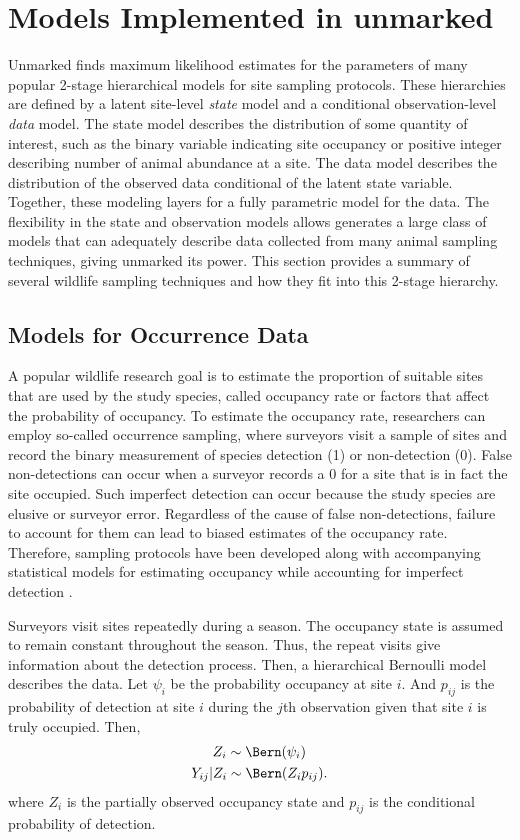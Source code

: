 \section{Models Implemented in unmarked}

Unmarked finds maximum likelihood estimates for the parameters of
many popular 2-stage hierarchical models for site sampling
protocols.  These hierarchies are defined by a latent site-level \emph{state}
model and a conditional observation-level \emph{data} model.  The state model
describes the distribution of some quantity of interest, such as the
binary variable indicating site
occupancy or positive integer describing number of animal abundance at
a site.  The data model describes the distribution of the observed data
conditional of the latent state variable.  Together, these modeling
layers for a fully parametric model for the data.  The flexibility in
the state and observation models allows generates a large class of
models that can adequately describe data collected from many animal
sampling techniques, giving unmarked its power.  This section provides
a summary of several wildlife sampling techniques and how they fit
into this 2-stage hierarchy.

\subsection{Models for Occurrence Data} \label{sec:occ}

A popular wildlife research goal is to estimate the proportion of
suitable sites that are used by the study species, called occupancy
rate or factors that affect the probability of occupancy.  To estimate
the occupancy rate, researchers can employ so-called occurrence
sampling, where surveyors visit a sample of sites and record the
binary measurement of species detection (1) or non-detection (0).
False non-detections can occur when a surveyor records a 0 for a site
that is in fact the site occupied.  Such imperfect detection can occur
because the study species are elusive or surveyor error.  Regardless
of the cause of false non-detections, failure to account for them can
lead to biased estimates of the occupancy rate.  Therefore, sampling
protocols have been developed along with accompanying statistical
models for estimating occupancy while accounting for imperfect
detection \citep{mackenzie_estimating_2002}.

Surveyors visit sites repeatedly during a season.  The occupancy state
is assumed to remain constant throughout the season.  Thus, the repeat
visits give information about the detection process.  Then, a
hierarchical Bernoulli model describes the data.  Let $\psi_i$ be the
probability occupancy at site $i$.  And $p_{ij}$ is the probability of
detection at site $i$ during the $j$th observation given that site $i$
is truly occupied.  Then,
\begin{gather}
Z_i \sim \Bern(\psi_i) \\
Y_{ij}|Z_i \sim \Bern(Z_i p_{ij}).
\end{gather}
where $Z_i$ is the partially observed occupancy state and $p_{ij}$ is
the conditional probability of detection.

